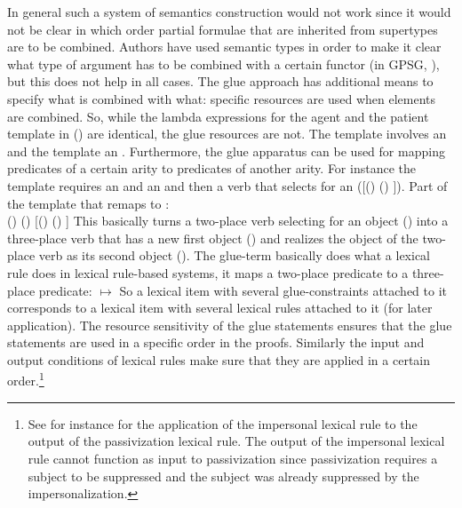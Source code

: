 
In general such a system of semantics construction would not work since it would not be clear in
which order partial formulae that are inherited from supertypes are to
be combined. Authors have used
semantic types in order to make it clear what type of argument has to be combined with a certain
functor (\eg in GPSG, \citealt[Chapter~9--10]{GKPS85a}), but this does not help in all cases. The glue approach has
additional means to specify what is combined with what: specific resources are used when elements are
combined. So, while the lambda expressions for the agent and the patient template in () are
identical, the glue resources are not. The  template involves an \argone and the 
template an \argtwo. Furthermore, the glue apparatus can be used for mapping predicates of a certain
arity to predicates of another arity. For instance the  template requires an  and an 
and then a verb that selects for an  ([(\upsig {}) \linimp (\upsig {}) \linimp \Upsig]). 
\ea
Part of the  template that remaps \argtwo to \argthree:\\
(\upsig {}) \linimp (\upsig {}) \linimp {}[(\upsig {}) \linimp (\upsig {}) \linimp \Upsig]
\z
This basically turns a two-place verb selecting for an object (\argtwo) into a three-place verb that
has a new first object (\argtwo) and realizes the object of the two-place verb as its second object (\argthree). The glue-term basically does what a lexical rule does in
lexical rule-based systems, it maps a two-place predicate to a three-place predicate:
\ea
{} $\mapsto$ 
\z
So a lexical item with several glue-constraints attached to it corresponds to a lexical item with
several lexical rules attached to it (for later application). The resource sensitivity of the glue statements ensures that
the glue statements are used in a specific order in the proofs. Similarly the input and output
conditions of lexical rules make sure that they are applied in a certain order.\footnote{%
See for instance  for the application of the impersonal lexical rule to the output of the
passivization lexical rule. The output of the impersonal lexical rule cannot function as input to
passivization since passivization requires a subject to be suppressed and the subject was already
suppressed by the impersonalization.}

